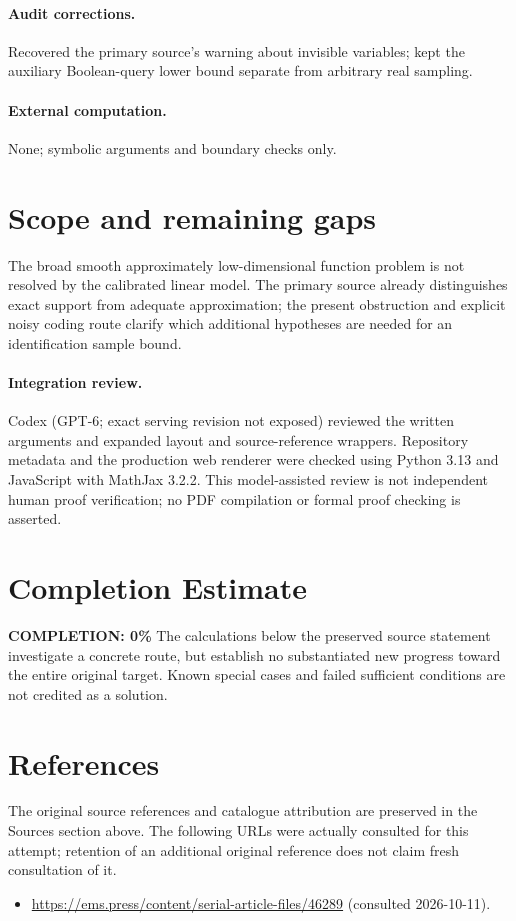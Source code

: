 \documentclass[11pt]{article}
\begin{document}
\paragraph{Audit corrections.} Recovered the primary source's warning about invisible variables; kept the auxiliary Boolean-query lower bound separate from arbitrary real sampling.
\paragraph{External computation.} None; symbolic arguments and boundary checks only.
\section{Scope and remaining gaps}
The broad smooth approximately low-dimensional function problem is not resolved by the calibrated linear model. The primary source already distinguishes exact support from adequate approximation; the present obstruction and explicit noisy coding route clarify which additional hypotheses are needed for an identification sample bound.
\paragraph{Integration review.} Codex (GPT-6; exact serving revision not exposed) reviewed the written arguments and expanded layout and source-reference wrappers. Repository metadata and the production web renderer were checked using Python 3.13 and JavaScript with MathJax 3.2.2. This model-assisted review is not independent human proof verification; no PDF compilation or formal proof checking is asserted.

\section{Completion Estimate}
\noindent\textbf{COMPLETION: 0\%}
The calculations below the preserved source statement investigate a concrete route,
but establish no substantiated new progress toward the entire original target.
Known special cases and failed sufficient conditions are not credited as a solution.
\section{References}
The original source references and catalogue attribution are preserved in the
Sources section above. The following URLs were actually consulted for this attempt;
retention of an additional original reference does not claim fresh consultation of it.
\begin{itemize}
\item \url{https://ems.press/content/serial-article-files/46289} (consulted 2026-10-11). 
\end{itemize}
\end{document}

